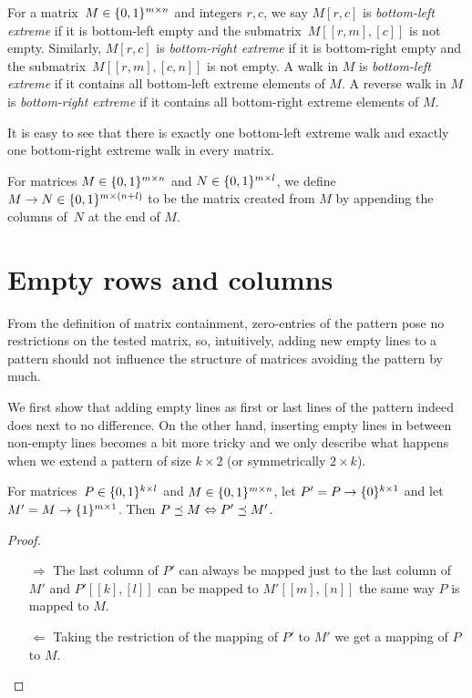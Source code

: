 \begin{defn}
For a matrix~$M\in\{0,1\}^{m\times n}$ and integers $r,c$, we say $M[r,c]$ is \emph{bottom-left extreme} if it is bottom-left empty and the submatrix~$M[[r,m],[c]]$ is not empty. Similarly, $M[r,c]$ is \emph{bottom-right extreme} if it is bottom-right empty and the submatrix~$M[[r,m],[c,n]]$ is not empty. A walk in $M$ is \emph{bottom-left extreme} if it contains all bottom-left extreme elements of $M$. A reverse walk in $M$ is \emph{bottom-right extreme} if it contains all bottom-right extreme elements of $M$.
\end{defn}

It is easy to see that there is exactly one bottom-left extreme walk and exactly one bottom-right extreme walk in every matrix.

\begin{defn}
For matrices $M\in\{0,1\}^{m\times n}$ and $N\in\{0,1\}^{m\times l}$, we define $M\rightarrow N\in\{0,1\}^{m\times(n+l)}$ to be the matrix created from $M$ by appending the columns of~$N$ at the end of $M$.
\end{defn}

\section{Empty rows and columns}
\label{sec:empty}
From the definition of matrix containment, zero-entries of the pattern pose no restrictions on the tested matrix, so, intuitively, adding new empty lines to a pattern should not influence the structure of matrices avoiding the pattern by much.

We first show that adding empty lines as first or last lines of the pattern indeed does next to no difference. On the other hand, inserting empty lines in between non-empty lines becomes a bit more tricky and we only describe what happens when we extend a pattern of size $k\times2$ (or symmetrically $2\times k$).

\begin{obs}
\label{obs:emptyrows}
For matrices~$P\in\{0,1\}^{k\times l}$ and $M\in\{0,1\}^{m\times n}$, let $P'=P\rightarrow\{0\}^{k\times1}$ and let $M'=M\rightarrow\{1\}^{m\times1}$. Then $P\preceq M\Leftrightarrow P'\preceq M'$.
\end{obs}
\begin{proof}
\begin{itemize}
	\item[$\Rightarrow$] The last column of $P'$ can always be mapped just to the last column of $M'$ and $P'[[k],[l]]$ can be mapped to $M'[[m],[n]]$ the same way $P$ is mapped to $M$.
	\item[$\Leftarrow$] Taking the restriction of the mapping of $P'$ to $M'$ we get a mapping of $P$ to $M$. \qedhere
\end{itemize}
\end{proof}


